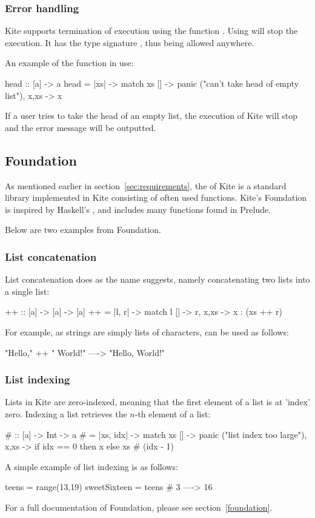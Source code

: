 \subsubsection{Error handling}
Kite supports termination of execution using the function . Using  will stop the execution. It has the type signature , thus being allowed anywhere.

An example of the  function in use:
\begin{kite}
head :: [a] -> a
head = |xs| -> {
  match xs {
    [] -> panic ("can't take head of empty list"),
    x,xs -> x
  }
}
\end{kite}
If a user tries to take the head of an empty list, the execution of Kite will stop and the error message will be outputted.


\subsection{Foundation}
As mentioned earlier in section~\ref{sec:requirements}, the  of Kite is a standard library implemented in Kite consisting of often used functions. Kite's Foundation is inspired by Haskell's , and includes many functions found in
Prelude.

Below are two examples from Foundation.

\subsubsection{List concatenation}
List concatenation does as the name suggests, namely concatenating two lists into a single list:

\begin{kite}
{++} :: [a] -> [a] -> [a]
{++} = |l, r| -> {
  match l {
    [] -> r,
    x,xs -> x : (xs ++ r)
  }
}
\end{kite}

For example, as strings are simply lists of characters, \code{++} can be used as follows:

\begin{kite}
"Hello," ++ " World!" ----> "Hello, World!"
\end{kite}

\subsubsection{List indexing}
Lists in Kite are zero-indexed, meaning that the first element of a list is at 'index' zero. Indexing a list retrieves the $n$-th element of a list:

\begin{kite}
{#} :: [a] -> Int -> a
{#} = |xs, idx| -> {
  match xs {
    [] -> panic ("list index too large"),
    x,xs -> if idx == 0 then x else xs # (idx - 1)
  }
}
\end{kite}

A simple example of list indexing is as follows:

\begin{kite}
teens = range(13,19)
sweetSixteen = teens # 3 ----> 16
\end{kite}

For a full documentation of Foundation, please see section~\ref{foundation}.
